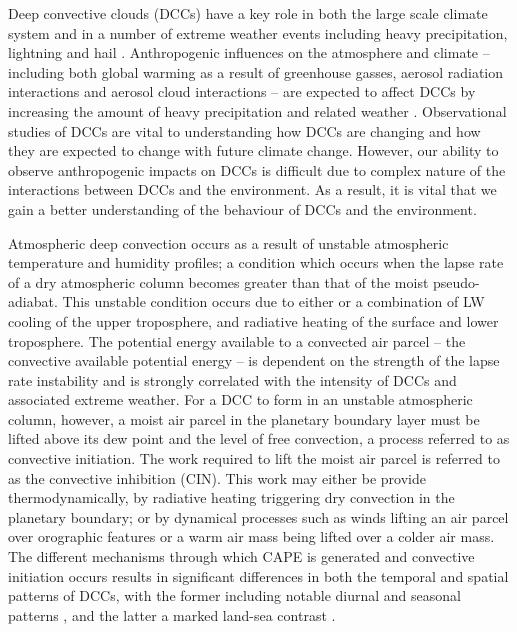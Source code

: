 Deep convective clouds (DCCs) have a key role in both the large scale climate system and in a number of extreme weather events including heavy precipitation, lightning and hail \citep[e.g.][]{westra_future_2014, houze_chapter_2014, williams_radar_1992, bruning_theory_2013, punge_hail_2016, matsudo_severe_2011}.
Anthropogenic influences on the atmosphere and climate -- including both global warming as a result of greenhouse gasses, aerosol radiation interactions and aerosol cloud interactions -- are expected to affect DCCs by increasing the amount of heavy precipitation and related weather \citep[e.g.][]{allen_constraints_2002, trenberth_changing_2003, held_robust_2006, khain2005aerosol, koren_smoke_2008, rosenfeld_flood_2008, fan_microphysical_2013, fan_review_2016}.
Observational studies of DCCs are vital to understanding how DCCs are changing and how they are expected to change with future climate change.
However, our ability to observe anthropogenic impacts on DCCs is difficult due to complex nature of the interactions between DCCs and the environment.
As a result, it is vital that we gain a better understanding of the behaviour of DCCs and the environment.

Atmospheric deep convection occurs as a result of unstable atmospheric temperature and humidity profiles; a condition which occurs when the lapse rate of a dry atmospheric column becomes greater than that of the moist pseudo-adiabat.
This unstable condition occurs due to either or a combination of LW cooling of the upper troposphere, and radiative heating of the surface and lower troposphere.
The potential energy available to a convected air parcel -- the convective available potential energy -- is dependent on the strength of the lapse rate instability and is strongly correlated with the intensity of DCCs and associated extreme weather.
For a DCC to form in an unstable atmospheric column, however, a moist air parcel in the planetary boundary layer must be lifted above its dew point and the level of free convection, a process referred to as convective initiation.
The work required to lift the moist air parcel is referred to as the convective inhibition (CIN).
This work may either be provide thermodynamically, by radiative heating triggering dry convection in the planetary boundary; or by dynamical processes such as winds lifting an air parcel over orographic features or a warm air mass being lifted over a colder air mass.
The different mechanisms through which CAPE is generated and convective initiation occurs results in significant differences in both the temporal and spatial patterns of DCCs, with the former including notable diurnal and seasonal patterns \citep{chen_diurnal_1997}, and the latter a marked land-sea contrast \citep{taylor_evaluating_2017}.

